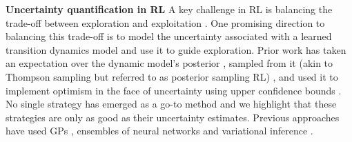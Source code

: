 \documentclass{article}
\begin{document}
\textbf{Uncertainty quantification in RL}
A key challenge in RL is balancing the trade-off between exploration and exploitation \cite{sutton2018reinforcement}.
One promising direction to balancing this trade-off is to model the uncertainty associated with a learned transition dynamics model and use it to guide exploration.
Prior work has taken an expectation over the dynamic model's posterior \cite{deisenroth2011pilco,kamtheDataEfficient2018,chuaDeepReinforcementLearning2018},
sampled from it (akin to Thompson sampling but referred to as posterior sampling RL)
\cite{osbandMoreEfficientReinforcement2013},
and used it to implement optimism in the face of uncertainty using upper confidence bounds \cite{curiEfficient2020}.
No single strategy has emerged as a go-to method and we highlight that these strategies are only as good as their uncertainty estimates.
Previous approaches have used GPs \cite{deisenroth2011pilco,kamtheDataEfficient2018},
ensembles of neural networks \cite{curiEfficient2020,chuaDeepReinforcementLearning2018}
and variational inference \cite{galImproving2016,houthooftVIME2017}. 






\end{document}
